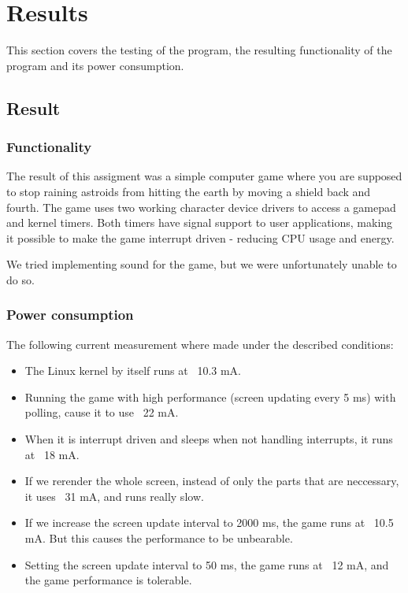 \section{Results}\label{chapter:Results and Tests}

This section covers the testing of the program, the resulting functionality of the program and its power consumption.

\subsection{Result}

\subsubsection{Functionality}

The result of this assigment was a simple computer game where you are supposed to stop raining astroids from hitting the earth by moving a shield back and fourth. The game uses two working character device drivers to access a gamepad and kernel timers. Both timers have signal support to user applications, making it possible to make the game interrupt driven - reducing CPU usage and energy. 

We tried implementing sound for the game, but we were unfortunately unable to do so. 

\subsubsection{Power consumption}

The following current measurement where made under the described conditions:  
\begin{itemize}
	\item The Linux kernel by itself runs at ~10.3 mA. 
	\item Running the game with high performance (screen updating every 5 ms) with polling, cause it to use ~22 mA. 
	\item When it is interrupt driven and sleeps when not handling interrupts, it runs at ~18 mA. 
	\item If we rerender the whole screen, instead of only the parts that are neccessary, it uses ~31 mA, and runs really slow.
	\item If we increase the screen update interval to 2000 ms, the game runs at ~10.5 mA. But this causes the performance to be unbearable. 
	\item Setting the screen update interval to 50 ms, the game runs at ~12 mA, and the game performance is tolerable. 
\end{itemize}
	
